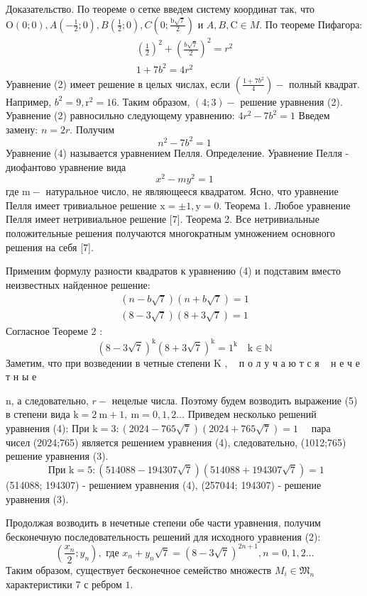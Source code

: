 \documentclass[a4paper,openbib]{article}
\begin{document}
Доказательство. По теореме о сетке введем систему координат так, что $\mathrm{O}(0 ; 0), A\left(-\frac{1}{2} ; 0\right), B\left(\frac{1}{2} ; 0\right), C\left(0 ; \frac{\mathrm{b} \sqrt{7}}{2}\right)$ и $A, B, \mathrm{C} \in M .$ По теореме
Пифагора:
$$
\begin{array}{c}
\left(\frac{1}{2}\right)^{2}+\left(\frac{b \sqrt{7}}{2}\right)^{2}=r^{2} \\
1+7 b^{2}=4 r^{2}
\end{array}
$$
Уравнение (2) имеет решение в целых числах, если $\left(\frac{1+7 b^{2}}{4}\right)-$ полный квадрат. Например, $b^{2}=9, \mathrm{r}^{2}=16 .$ Таким образом, $(4 ; 3)-$ решение уравнения (2).
Уравнение (2) равносильно следующему уравнению:
$4 r^{2}-7 b^{2}=1$
Введем замену: $n=2 r .$ Получим
$$
n^{2}-7 b^{2}=1
$$
Уравнение (4) называется уравнением Пелля. Определение. Уравнение Пелля - диофантово уравнение вида
$$
x^{2}-m y^{2}=1
$$
где $\mathrm{m}-$ натуральное число, не являющееся квадратом. Ясно, что уравнение Пелля имеет тривиальное решение $\mathrm{x}=\pm 1, \mathrm{y}=0 .$ Теорема 1. Любое уравнение Пелля имеет нетривиальное решение [7]. Теорема 2. Все нетривиальные положительные решения получаются многократным умножением основного решения на себя [7].

Применим формулу разности квадратов к уравнению (4) и подставим вместо неизвестных найденное решение:
$$
\begin{array}{l}
(n-b \sqrt{7})(n+b \sqrt{7})=1 \\
(8-3 \sqrt{7})(8+3 \sqrt{7})=1
\end{array}
$$
Согласное Теореме 2 :
$$
(8-3 \sqrt{7})^{\mathrm{k}}(8+3 \sqrt{7})^{\mathrm{k}}=1^{\mathrm{k}} \quad \mathrm{k} \in \mathbb{N}
$$
Заметим, что при возведении в четные степени \textrm{K} , ~ п о л у ч а ю т с я ~ н е ч е т н ы е ~

n, а следовательно, $r-$ нецелые числа. Поэтому будем возводить выражение
(5) в степени вида $\mathrm{k}=2 \mathrm{~m}+1, \mathrm{~m}=0,1,2 \ldots$
Приведем несколько решений уравнения (4):
При $\mathrm{k}=3:(2024-765 \sqrt{7})(2024+765 \sqrt{7})=1 \quad$ пара $\quad$ чисел
(2024;765) является решением уравнения (4), следовательно, (1012;765) решение уравнения (3).
$$
\text { При } \mathrm{k}=5:(514088-194307 \sqrt{7})(514088+194307 \sqrt{7})=1
$$
(514088; 194307) - решением уравнения (4), (257044; 194307) - решение уравнения (3).

Продолжая возводить в нечетные степени обе части уравнения, получим бесконечную последовательность решений для исходного уравнения (2):
$$
\left(\frac{x_{n}}{2} ; y_{n}\right), \text { где } x_{n}+y_{n} \sqrt{7}=(8-3 \sqrt{7})^{2 n+1}, n=0,1,2 \ldots
$$
Таким образом, существует бесконечное семейство множеств $M_{i} \in \mathfrak{M}_{n}$ характеристики 7 с ребром $1 .$
\end{document}
